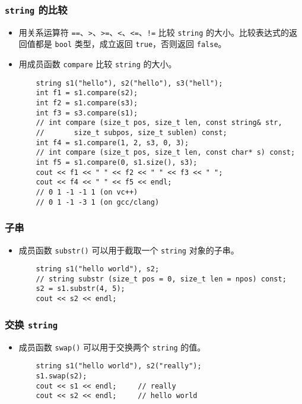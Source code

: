 \documentclass[UTF8]{ctexart}
\begin{document}
\subsubsection{\texttt{string} 的比较}
\begin{itemize}
    \item 用关系运算符 \texttt{==}、\texttt{>}、\texttt{>=}、\texttt{<}、\texttt{<=}、\texttt{!=} 比较
    \texttt{string} 的大小。比较表达式的返回值都是 \texttt{bool} 类型，成立返回
    \texttt{true}，否则返回 \texttt{false}。
    \item 用成员函数 \texttt{compare} 比较 \texttt{string} 的大小。
    \begin{verbatim}
    string s1("hello"), s2("hello"), s3("hell");
    int f1 = s1.compare(s2);
    int f2 = s1.compare(s3);
    int f3 = s3.compare(s1);
    // int compare (size_t pos, size_t len, const string& str,
    //       size_t subpos, size_t sublen) const;
    int f4 = s1.compare(1, 2, s3, 0, 3);
    // int compare (size_t pos, size_t len, const char* s) const;
    int f5 = s1.compare(0, s1.size(), s3);
    cout << f1 << " " << f2 << " " << f3 << " ";
    cout << f4 << " " << f5 << endl;
    // 0 1 -1 -1 1 (on vc++)
    // 0 1 -1 -3 1 (on gcc/clang)
    \end{verbatim}
\end{itemize}

\subsubsection{子串}
\begin{itemize}
    \item 成员函数 \texttt{substr()} 可以用于截取一个 \texttt{string} 对象的子串。
    \begin{verbatim}
    string s1("hello world"), s2;
    // string substr (size_t pos = 0, size_t len = npos) const;
    s2 = s1.substr(4, 5);
    cout << s2 << endl;
    \end{verbatim}
\end{itemize}

\subsubsection{交换 \texttt{string}}
\begin{itemize}
    \item 成员函数 \texttt{swap()} 可以用于交换两个 \texttt{string} 的值。
    \begin{verbatim}
    string s1("hello world"), s2("really");
    s1.swap(s2);
    cout << s1 << endl;     // really
    cout << s2 << endl;     // hello world
    \end{verbatim}
\end{itemize}
\end{document}
